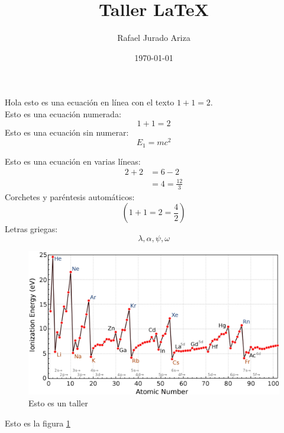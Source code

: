\documentclass[a4paper]{article}
\title{\vspace{-1.5cm}Taller \LaTeX}
\author{Rafael Jurado Ariza}
\date{\today}
\begin{document}
    \maketitle
    Hola esto es una ecuación en línea con el texto $1+1=2$.\\
    Esto es una ecuación numerada:
    \begin{equation} 
        1+1=2
    \end{equation}
    Esto es una ecuación sin numerar:
    \begin{equation*}
        E_1=mc^2 
    \end{equation*}
    
    Esto es una ecuación en varias líneas:
    \begin{align*}
        2+2&=6-2\\
        &=4=\frac{12}{3}
    \end{align*}
    Corchetes y paréntesis automáticos: 
    \begin{equation*}  
        \left(1+1=2=\frac{4}{2}\right) 
    \end{equation*}
    Letras griegas:
    \begin{equation*}
        \lambda,\alpha,\psi,\omega
    \end{equation*}
    \begin{figure}[h!]
        \centering
        \includegraphics[scale=0.18]{pic/Ionization_energies.png}
        \caption{Esto es un taller}
        \label{fig:energy}
    \end{figure}
    \newpage 
    Esto es la figura \ref{fig:energy}
\end{document}
